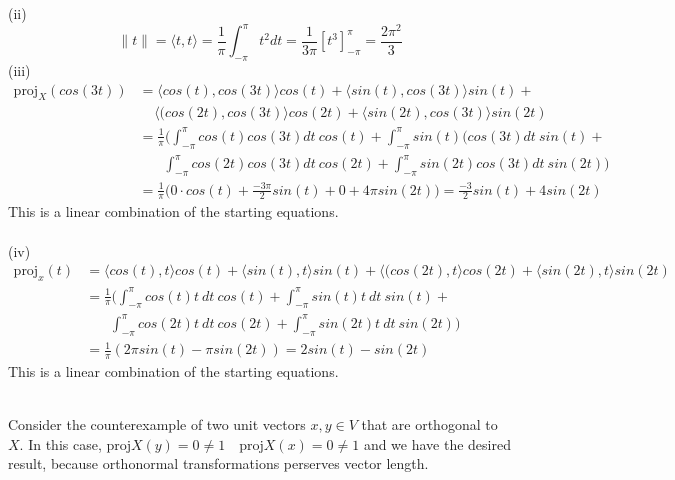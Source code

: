 \documentclass[letterpaper,12pt]{article}
\theoremstyle{definition}
\begin{document}
(ii)\\
\[\|t\| = \langle  t,t \rangle   = \frac{1}{\pi}\int_{-\pi}^{\pi}t^2dt = \frac{1}{3\pi}[t^3]^\pi_{-\pi}=\frac{2\pi^2}{3}\]
(iii)\\
\begin{align*}
    \text{proj}_X(cos(3t)) &= \langle  cos(t),cos(3t)\rangle   cos(t)+\langle  sin(t),cos(3t)\rangle   sin(t)+\\ 
&~~~~~\langle  (cos(2t),cos(3t)\rangle   cos(2t) +\langle  sin(2t),cos(3t)\rangle   sin(2t)\\
&=\frac{1}{\pi}\bigg(\int^\pi_{-\pi}cos(t)cos(3t)dt ~cos(t)+\int^\pi_{-\pi}sin(t)(cos(3t)dt ~sin(t)+\\ 
&~~~~~~~~\int^\pi_{-\pi}cos(2t)cos(3t)dt~cos(2t)+ \int^\pi_{-\pi}sin(2t)cos(3t)dt~sin(2t)\bigg)\\
&=\frac{1}{\pi}\big(0 \cdot cos(t)+\frac{-3\pi}{2}sin(t)+0+4\pi sin(2t)\big)=\frac{-3}{2}sin(t)+ 4sin(2t)
\end{align*}
This is a linear combination of the starting equations.\\ \\
(iv)\\
\begin{align*}
    \text{proj}_{x}(t) &= \langle cos(t),t\rangle cos(t)+\langle  sin(t),t\rangle sin(t) + \langle  (cos(2t),t\rangle   cos(2t) +\langle  sin(2t),t\rangle   sin(2t)\\
&=\frac{1}{\pi}\bigg(\int^\pi_{-\pi}cos(t)t~dt ~cos(t)+\int^\pi_{-\pi}sin(t)t~dt ~sin(t)+\\ 
&~~~~~~~~\int^\pi_{-\pi}cos(2t)t~dt~cos(2t)+ \int^\pi_{-\pi}sin(2t)t~dt~sin(2t)\bigg) \\
&=\frac{1}{\pi}(2\pi sin(t)-\pi sin(2t))=2sin(t)-sin(2t)
\end{align*}
This is a linear combination of the starting equations.

\\

Consider the counterexample of two unit vectors $x,y \in V$ that are orthogonal to $X$. In this case, $\text{proj}X(y)= 0 \neq 1 \quad \text{proj}X(x)= 0 \neq 1 $ and we have the desired result, because orthonormal transformations perserves vector length.

\\
\end{document}
